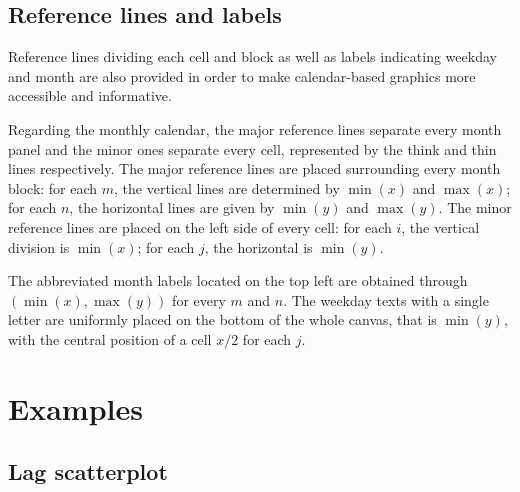 \documentclass[article]{jss}
\begin{document}
\subsection{Reference lines and
labels}\label{reference-lines-and-labels}

Reference lines dividing each cell and block as well as labels
indicating weekday and month are also provided in order to make
calendar-based graphics more accessible and informative.

Regarding the monthly calendar, the major reference lines separate every
month panel and the minor ones separate every cell, represented by the
think and thin lines respectively. The major reference lines are placed
surrounding every month block: for each \(m\), the vertical lines are
determined by \(\min{(x)}\) and \(\max{(x)}\); for each \(n\), the
horizontal lines are given by \(\min{(y)}\) and \(\max{(y)}\). The minor
reference lines are placed on the left side of every cell: for each
\(i\), the vertical division is \(\min{(x)}\); for each \(j\), the
horizontal is \(\min{(y)}\).

The abbreviated month labels located on the top left are obtained
through \((\min{(x)}, \max{(y)})\) for every \(m\) and \(n\). The
weekday texts with a single letter are uniformly placed on the bottom of
the whole canvas, that is \(\min{(y)}\), with the central position of a
cell \(x / 2\) for each \(j\).

\section{Examples}\label{examples}

\label{sec:examples}

\subsection{Lag scatterplot}\label{lag-scatterplot}
\end{document}
